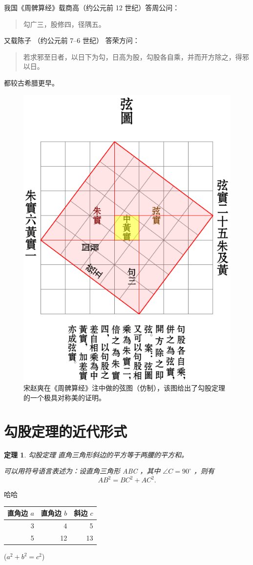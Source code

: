 \documentclass[UTF8]{ctexart}
\begin{document}
我国《周髀算经》载商高（约公元前 12 世纪）答周公问：
\begin{quote}
\kaishu
勾广三，股修四，径隅五。
\end{quote}
又载陈子 （约公元前 7--6 世纪） 答荣方问：
\begin{quote}
\kaishu
若求邪至日者，以日下为勾，日高为股，勾股各自乘，并而开方除之，得邪以日。
\end{quote}
都较古希腊更早。
\begin{figure}[ht]
  \centering
  \includegraphics[scale=0.6]{xiantu.pdf}
  \caption{宋赵爽在《周髀算经》注中做的弦图（仿制），该图给出了勾股定理的一个极具对称美的证明。}
  \label{fig:xiantu}
\end{figure}

\section{勾股定理的近代形式}
\newtheorem{thm}{定理}
\begin{thm}{勾股定理}
直角三角形斜边的平方等于两腰的平方和。

可以用符号语言表述为：设直角三角形 ABC ，其中 $\angle C = 90^\circ$ ，则有
\begin{equation}
AB^2 = BC ^2 + AC^2.
\end{equation}
\end{thm}

哈哈
\begin{table}[H]
\begin{tabular}{|rrr|}
\hline
直角边 $a$ & 直角边 $b$ & 斜边 $c$ \\
\hline
	3	&		4	&		5 \\
	5	&		12 	&		13 \\
\hline 
\end{tabular}%
\qquad
($a^2 + b^2 = c^2$)
\end{table}


\end{document}
